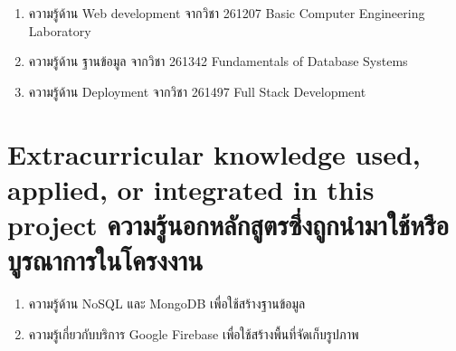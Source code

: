 \begin{enumerate}
  \item ความรู้ด้าน Web development จากวิชา 261207 Basic Computer Engineering Laboratory
  \item ความรู้ด้าน ฐานข้อมูล จากวิชา 261342 Fundamentals of Database Systems
  \item ความรู้ด้าน Deployment จากวิชา 261497 Full Stack Development
\end{enumerate}

\section{\ifenglish%
Extracurricular knowledge used, applied, or integrated in this project
\else%
ความรู้นอกหลักสูตรซึ่งถูกนำมาใช้หรือบูรณาการในโครงงาน
\fi
}

\begin{enumerate}
  \item ความรู้ด้าน NoSQL และ MongoDB เพื่อใช้สร้างฐานข้อมูล
  \item ความรู้เกี่ยวกับบริการ Google Firebase เพื่อใช้สร้างพื้นที่จัดเก็บรูปภาพ
\end{enumerate}
